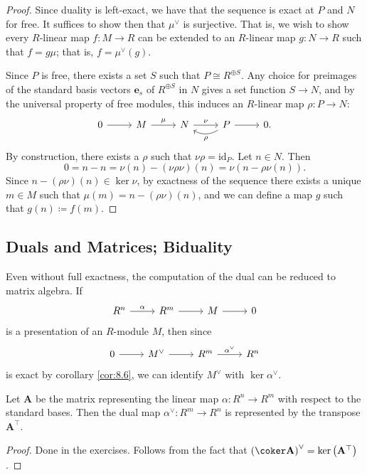 \begin{proof}
	Since duality is left-exact, we have that the sequence is exact at $P$ and $N$ for free. It suffices to show then that $\mu ^{\vee} $ is surjective. That is, we wish to show every $R$-linear map $f : M \to R$ can be extended to an $R$-linear map $g : N \to R$ such that $f=g\mu $; that is, $f=\mu ^{\vee} (g)$.

	Since $P$ is free, there exists a set $S$ such that $P \cong R^{\oplus S} $. Any choice for preimages of the standard basis vectors $\mathbf{e}_s$ of $R^{\oplus S} $ in $N$ gives a set function $S\to N$, and by the universal property of free modules, this induces an $R$-linear map $\rho : P \to N$:
	\[\begin{tikzcd}[row sep = 2.5em, column sep = 2.5em]
		0\arrow[r]&M\arrow[r, "\mu "]&N\arrow[r, "\nu "]&P\arrow[l, bend left, "\rho "]\arrow[r]&0.
	\end{tikzcd}\]
	By construction, there exists a $\rho $ such that $\nu \rho =\mathrm{id}_P$. Let $n\in N$. Then
	\[
		0=n-n=\nu (n)-(\nu \rho \nu )(n)=\nu (n-\rho \nu (n))
	.\]
	Since $n-(\rho \nu )(n)\in \ker \nu $, by exactness of the sequence there exists a unique $m\in M$ such that $\mu (m)=n-(\rho \nu )(n)$, and we can define a map $g$ such that $g(n)\coloneqq f(m)$.
\end{proof}

\subsection{Duals and Matrices; Biduality}
Even without full exactness, the computation of the dual can be reduced to matrix algebra. If
\[\begin{tikzcd}[row sep = 2.5em, column sep = 2.5em]
	R^n\arrow[r, "\alpha "]&R^m\arrow[r]&M\arrow[r]&0
\end{tikzcd}\]
is a presentation of an $R$-module $M$, then since
\[\begin{tikzcd}[row sep = 2.5em, column sep = 2.5em]
	0\arrow[r]&M^{\vee} \arrow[r]&R^m\arrow[r, "\alpha ^{\vee} "]&R^n
\end{tikzcd}\]
is exact by corollary \ref{cor:8.6}, we can identify $M^{\vee} $ with $\ker \alpha ^{\vee}  $.
\begin{lemma}\label{lma:8.10}
	Let $\mathbf{A} $ be the matrix representing the linear map $\alpha : R^n \to R^m$ with respect to the standard bases. Then the dual map $\alpha ^{\vee} : R^m \to R^n$ is represented by the transpose $\mathbf{A}^{\top} $.
\end{lemma}
\begin{proof}
	Done in the exercises. Follows from the fact that $\left( \coker \mathbf{A}  \right)^{\vee} =\ker \left( \mathbf{A} ^{\top}  \right) $.
\end{proof}

